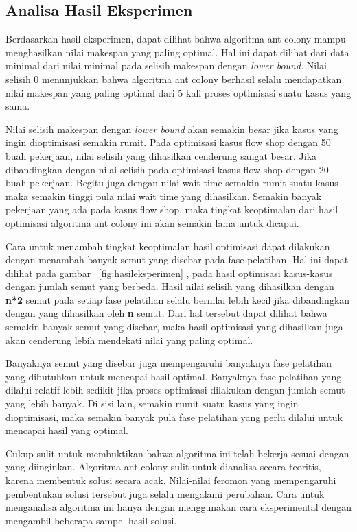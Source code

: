 \subsection{Analisa Hasil Eksperimen}

Berdasarkan hasil eksperimen, dapat dilihat bahwa algoritma ant colony mampu menghasilkan nilai
makespan yang paling optimal. Hal ini dapat dilihat dari data minimal dari nilai minimal pada
selisih makespan dengan \textit{lower bound}. Nilai selisih 0 menunjukkan bahwa algoritma ant colony
berhasil selalu mendapatkan nilai makespan yang paling optimal dari 5 kali proses optimisasi suatu
kasus yang sama. 

Nilai selisih makespan dengan \textit{lower bound} akan semakin besar jika kasus yang
ingin dioptimisasi semakin rumit. Pada optimisasi kasus flow shop dengan 50 buah pekerjaan,
nilai selisih yang dihasilkan cenderung sangat besar. Jika dibandingkan dengan nilai selisih pada
optimisasi kasus flow shop dengan 20 buah pekerjaan. Begitu juga dengan nilai wait time semakin rumit suatu kasus maka semakin tinggi pula nilai wait time yang dihasilkan. Semakin banyak
pekerjaan yang ada pada kasus flow shop, maka tingkat keoptimalan dari hasil optimisasi algoritma ant colony ini akan semakin lama untuk dicapai.

Cara untuk menambah tingkat keoptimalan hasil optimisasi dapat dilakukan dengan menambah
banyak semut yang disebar pada fase pelatihan. Hal ini dapat dilihat pada gambar  ~\ref{fig:hasileksperimen} , pada
hasil optimisasi kasus-kasus dengan jumlah semut yang berbeda. Hasil nilai selisih yang dihasilkan
dengan \textbf{n*2} semut pada setiap fase pelatihan selalu bernilai lebih kecil jika dibandingkan dengan
yang dihasilkan oleh \textbf{n} semut. Dari hal tersebut dapat dilihat bahwa semakin banyak semut yang
disebar, maka hasil optimisasi yang dihasilkan juga akan cenderung lebih mendekati nilai yang
paling optimal.

Banyaknya semut yang disebar juga mempengaruhi banyaknya fase pelatihan yang dibutuhkan
untuk mencapai hasil optimal. Banyaknya fase pelatihan yang dilalui relatif lebih sedikit jika proses
optimisasi dilakukan dengan jumlah semut yang lebih banyak. Di sisi lain, semakin rumit suatu
kasus yang ingin dioptimisasi, maka semakin banyak pula fase pelatihan yang perlu dilalui untuk
mencapai hasil yang optimal.

Cukup sulit untuk membuktikan bahwa algoritma ini telah bekerja sesuai dengan yang diinginkan.
Algoritma ant colony sulit untuk dianalisa secara teoritis, karena membentuk solusi secara
acak. Nilai-nilai feromon yang mempengaruhi pembentukan solusi tersebut juga selalu mengalami perubahan.
Cara untuk menganalisa algoritma ini hanya dengan menggunakan cara eksperimental dengan
mengambil beberapa sampel hasil solusi.

